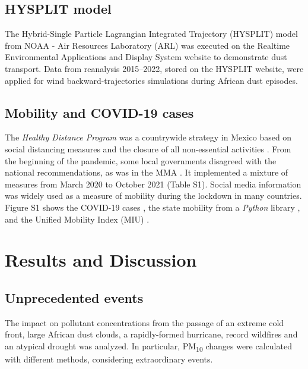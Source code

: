 \documentclass[sn-mathphys-num]{sn-jnl}
\begin{document}
\subsection{HYSPLIT model}
The Hybrid-Single Particle Lagrangian Integrated Trajectory (HYSPLIT) model from NOAA - Air Resources Laboratory (ARL) \citep{Stein_2015} was executed on the Realtime Environmental Applications and Display System website to demonstrate dust transport. Data from reanalysis 2015–2022, stored on the HYSPLIT website, were applied for wind backward-trajectories simulations during African dust episodes.
\subsection{Mobility and COVID-19 cases}
The \emph{Healthy Distance Program} was a countrywide strategy in Mexico based on social distancing measures and the closure of all non-essential activities \citep{covid-19a}. From the beginning of the pandemic, some local governments disagreed with the national recommendations, as was in the MMA \citep{state}. It implemented a mixture of measures from March 2020 to October 2021 (Table S1). Social media information was widely used as a measure of mobility during the lockdown in many countries. Figure S1 shows the COVID-19 cases \citep{covid19mex}, the state mobility from a \emph{Python} library \citep{Graff_2022}, and the Unified Mobility Index (MIU) \citep{conacyt}.
\section{Results and Discussion}
\subsection{Unprecedented events}
The impact on pollutant concentrations from the passage of an extreme cold front, large African dust clouds, a rapidly-formed hurricane, record wildfires and an atypical drought was analyzed. In particular, PM\textsubscript{10} changes were calculated with different methods, considering extraordinary events.
\end{document}
